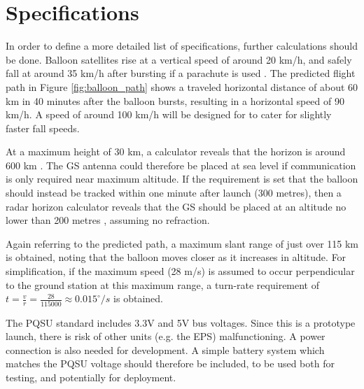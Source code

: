 \graphicspath{{./figures}}

\section{Specifications}

In order to define a more detailed list of specifications, further calculations should be done. Balloon satellites rise at a vertical speed of around 20 km/h, and safely fall at around 35 km/h after bursting if a parachute is used \cite{site-weatherWeatherBalloons}. The predicted flight path in Figure \ref{fig:balloon_path} shows a traveled horizontal distance of about 60 km in 40 minutes after the balloon bursts, resulting in a horizontal speed of 90 km/h. A speed of around 100 km/h will be designed for to cater for slightly faster fall speeds.

At a maximum height of 30 km, a calculator reveals that the horizon is around 600 km \cite{site-normalHorizon}. The GS antenna could therefore be placed at sea level if communication is only required near maximum altitude. If the requirement is set that the balloon should instead be tracked within one minute after launch (300 metres), then a radar horizon calculator reveals that the GS should be placed at an altitude no lower than 200 metres \cite{site-radarHorizon}, assuming no refraction.

Again referring to the predicted path, a maximum slant range of just over 115 km is obtained, noting that the balloon moves closer as it increases in altitude. For simplification, if the maximum speed (28 m/s) is assumed to occur perpendicular to the ground station at this maximum range, a turn-rate requirement of $t = \frac{v}{r} = \frac{28}{115000} \approx 0.015^\circ / s$ is obtained.

The PQSU standard includes 3.3V and 5V bus voltages. Since this is a prototype launch, there is risk of other units (e.g. the EPS) malfunctioning. A power connection is also needed for development. A simple battery system which matches the PQSU voltage should therefore be included, to be used both for testing, and potentially for deployment.

